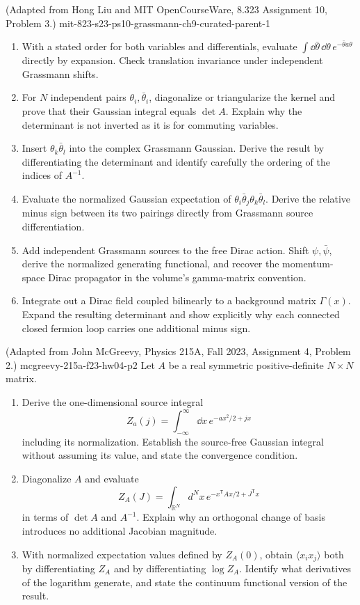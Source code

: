 \begin{enumerate}
  {(Adapted from Hong Liu and MIT OpenCourseWare, 8.323 Assignment 10, Problem 3.)}
  {mit-823-s23-ps10-grassmann-ch9-curated-parent-1}
\begin{enumerate}
\item
With a stated order for both variables and differentials, evaluate
\(\int \dd\bar\theta\,\dd\theta\,e^{-\bar\theta a\theta}\) directly by
expansion.  Check translation invariance under independent Grassmann
shifts.
\item
For \(N\) independent pairs \(\theta_i,\bar\theta_i\), diagonalize or
triangularize the kernel and prove that their Gaussian integral equals
\(\det A\).  Explain why the determinant is not inverted as it is for
commuting variables.
\item
Insert \(\theta_k\bar\theta_l\) into the complex Grassmann Gaussian.
Derive the result by differentiating the determinant and identify carefully
the ordering of the indices of \(A^{-1}\).
\item
Evaluate the normalized Gaussian expectation of
\(\theta_i\bar\theta_j\theta_k\bar\theta_l\).  Derive the relative minus
sign between its two pairings directly from Grassmann source
differentiation.
\item
Add independent Grassmann sources to the free Dirac action.  Shift
\(\psi,\bar\psi\), derive the normalized generating functional, and recover
the momentum-space Dirac propagator in the volume's gamma-matrix
convention.
\item
Integrate out a Dirac field coupled bilinearly to a background matrix
\(\Gamma(x)\).  Expand the resulting determinant and show explicitly why
each connected closed fermion loop carries one additional minus sign.
\end{enumerate}

  {(Adapted from John McGreevy, Physics 215A, Fall 2023, Assignment 4, Problem 2.)}
  {mcgreevy-215a-f23-hw04-p2}
Let \(A\) be a real symmetric positive-definite \(N\times N\) matrix.
\begin{enumerate}
\item
Derive the one-dimensional source integral
\[
 Z_a(j)=\int_{-\infty}^{\infty}\dd x\,
 e^{-ax^2/2+jx}
\]
including its normalization.  Establish the source-free Gaussian integral
without assuming its value, and state the convergence condition.
\item
Diagonalize \(A\) and evaluate
\[
 Z_A(J)=\int_{\mathbb R^N}d^Nx\,
 e^{-x^{\mathsf T}Ax/2+J^{\mathsf T}x}
\]
in terms of \(\det A\) and \(A^{-1}\).  Explain why an orthogonal change of
basis introduces no additional Jacobian magnitude.
\item
With normalized expectation values defined by \(Z_A(0)\), obtain
\(\langle x_i x_j\rangle\) both by differentiating \(Z_A\) and by
differentiating \(\log Z_A\).  Identify what derivatives of the logarithm
generate, and state the continuum functional version of the result.
\end{enumerate}


\end{enumerate}
